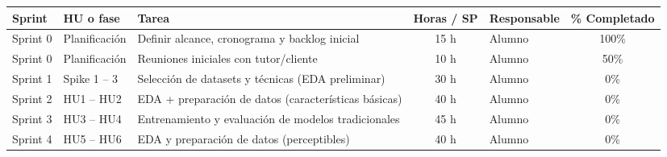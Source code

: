\documentclass[
11pt, %
]{charter}
\begin{document}

\begin{table}[htpb]
\centering
\begin{tabularx}{\linewidth}{@{}|l|l|X|c|l|c|@{}}
\hline
\rowcolor[HTML]{C0C0C0}
Sprint & HU o fase & Tarea & Horas / SP & Responsable & \% Completado \\ \hline
Sprint 0 & Planificación & Definir alcance, cronograma y backlog inicial & 15 h & Alumno & 100\% \\ \hline
Sprint 0 & Planificación & Reuniones iniciales con tutor/cliente & 10 h & Alumno & 50\% \\ \hline
Sprint 1 & Spike 1 – 3 & Selección de datasets y técnicas (EDA preliminar) & 30 h & Alumno & 0\% \\ \hline
Sprint 2 & HU1 – HU2 & EDA + preparación de datos (características básicas) & 40 h & Alumno & 0\% \\ \hline
Sprint 3 & HU3 – HU4 & Entrenamiento y evaluación de modelos tradicionales & 45 h & Alumno & 0\% \\ \hline
Sprint 4 & HU5 – HU6 & EDA y preparación de datos (perceptibles) & 40 h & Alumno & 0\% \\ \hline

\end{tabularx}
\end{table}
\end{document}
